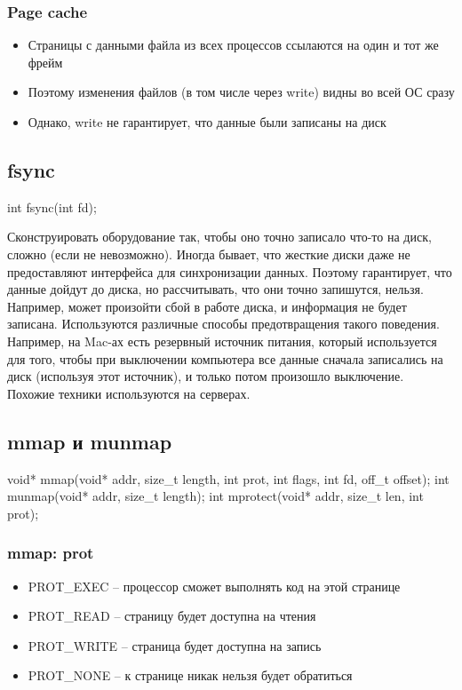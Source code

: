     \subsubsection{Page cache}
      \begin{itemize}
        \item Страницы с данными файла из всех процессов ссылаются на один и тот же фрейм
        \item Поэтому изменения файлов (в том числе через write) видны во всей ОС сразу
        \item Однако, write не гарантирует, что данные были записаны на диск
      \end{itemize}
    
    \subsection{fsync}
\begin{cminted}
int fsync(int fd);
\end{cminted}
Сконструировать оборудование так, чтобы оно точно записало что-то на диск, сложно (если не невозможно). Иногда бывает, что жесткие диски даже не предоставляют интерфейса для синхронизации данных. Поэтому  гарантирует, что данные дойдут до диска, но рассчитывать, что они точно запишутся, нельзя. Например, может произойти сбой в работе диска, и информация не будет записана. Используются различные способы предотвращения такого поведения. Например, на Mac-ах есть резервный источник питания, который используется для того, чтобы при выключении компьютера все данные сначала записались на диск (используя этот источник), и только потом произошло выключение. Похожие техники используются на серверах.

    \subsection{mmap и munmap}
\begin{cminted}
void* mmap(void* addr, size_t length, int prot, int flags,
           int fd, off_t offset);
int munmap(void* addr, size_t length);
int mprotect(void* addr, size_t len, int prot);
\end{cminted}
    
    \subsubsection{mmap: prot}
      \begin{itemize}
        \item PROT\_EXEC -- процессор сможет выполнять код на этой странице
        \item PROT\_READ -- страницу будет доступна на чтения
        \item PROT\_WRITE -- страница будет доступна на запись
        \item PROT\_NONE -- к странице никак нельзя будет обратиться
      \end{itemize}
    
